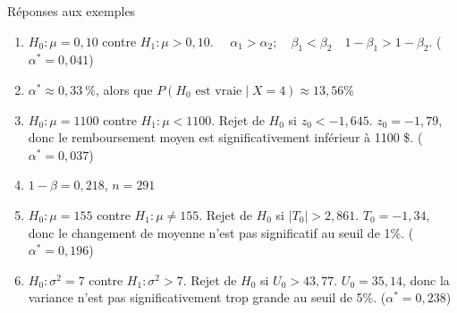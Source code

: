 \documentclass{BeamerTemplate}
\begin{document}
\begin{frame}[t]{Réponses aux exemples}

{\scriptsize

\begin{enumerate}
  \item $H_0:\mu=0,10$ contre $H_1: \mu>0,10$. $\quad\alpha_1>\alpha_2; \quad\beta_1<\beta_2 \quad1-\beta_1>1-\beta_2$. ($\alpha^*=0,041$)
  \item $\alpha^*\approx 0,33~\%$, alors que $P(H_0\text{\ est vraie}\;|\;X=4)\approx13,56\%$
  \item $H_0:\mu=1100$ contre $H_1: \mu<1100$. Rejet de $H_0$ si $z_0<-1,645$. $z_0=-1,79$, donc le remboursement moyen est significativement inférieur à 1100 \$. ($\alpha^*=0,037$)
  \item $1-\beta = 0,218$, $n=291$
  \item $H_0:\mu=155$ contre $H_1: \mu\ne 155$. Rejet de $H_0$ si $|T_0|>2,861$. $T_0=-1,34$, donc le changement de moyenne n'est pas significatif au seuil de 1\%. ($\alpha^*=0,196$)
  \item  $H_0:\sigma^2=7$ contre $H_1: \sigma^2>7$. Rejet de $H_0$ si $U_0>43,77$. $U_0=35,14$, donc la variance n'est pas significativement trop grande au seuil de 5\%. ($\alpha^*=0,238$)
 \end{enumerate}
 }
\end{frame}
\end{document}
